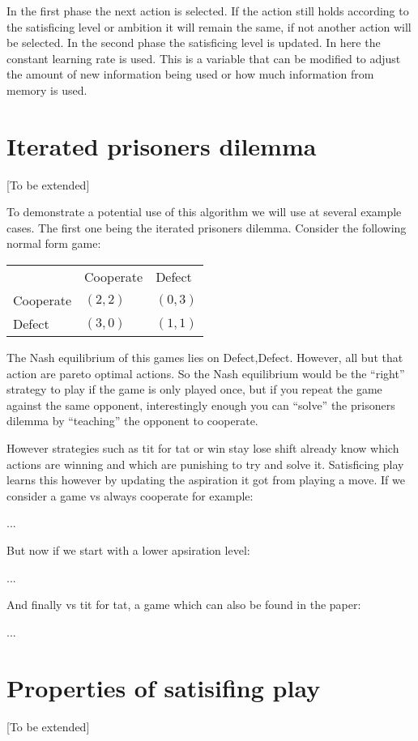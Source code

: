 In the first phase the next action is selected. If the action still holds
according to the satisficing level or ambition it will remain the same, if not another
action will be selected. In the second phase the satisficing level is updated.
In here the constant learning rate is used. This is a variable that can be
modified to adjust the amount of new information being used or how much
information from memory is used.


\section{Iterated prisoners dilemma}
[To be extended]

To demonstrate a potential use of this algorithm we will use at several example
cases. The first one being the iterated prisoners dilemma. Consider
the following normal form game:

\begin{tabular}{lll}
            & Cooperate   & Defect \\
  Cooperate & $(2,2)$     & $(0,3)$  \\
  Defect    & $(3,0)$     & $(1,1)$  \\
\end{tabular}

The Nash equilibrium of this games lies on Defect,Defect. However, all but
that action are pareto optimal actions. So the Nash equilibrium would be the
``right'' strategy to play if the game is only played once, but if you repeat
the game against the same opponent, interestingly enough you can ``solve''
the prisoners dilemma by ``teaching'' the opponent to cooperate.

However strategies such as tit for tat or win stay lose shift already know
which actions are winning and which are punishing to try and solve it.
Satisficing play learns this however by updating the aspiration it got from
playing a move. If we consider a game vs always cooperate for example:

...

But now if we start with a lower apsiration level:

...

And finally vs tit for tat, a game which can also be found in the
\citep{stimpson:2001} paper:

...
\section{Properties of satisifing play}
[To be extended]

